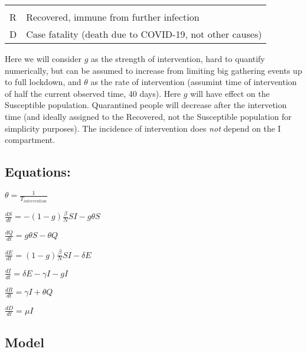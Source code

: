 \documentclass[]{article}
\begin{document}
\begin{longtable}[]{@{}ll@{}}
\begin{minipage}[t]{0.83\columnwidth}
\end{minipage}\tabularnewline
\begin{minipage}[t]{0.11\columnwidth}\raggedright
R\strut
\end{minipage} & \begin{minipage}[t]{0.83\columnwidth}\raggedright
Recovered, immune from further infection\strut
\end{minipage}\tabularnewline
\begin{minipage}[t]{0.11\columnwidth}\raggedright
D\strut
\end{minipage} & \begin{minipage}[t]{0.83\columnwidth}\raggedright
Case fatality (death due to COVID-19, not other causes)\strut
\end{minipage}\tabularnewline
\bottomrule
\end{longtable}

Here we will consider \(g\) as the strength of intervention, hard to
quantify numerically, but can be assumed to increase from limiting big
gathering events up to full lockdown, and \(\theta\) as the rate of
intervention (assumint time of intervention of half the current observed
time, 40 days). Here \(g\) will have effect on the Susceptible
population. Quarantined people will decrease after the intervetion time
(and ideally assigned to the Recovered, not the Susceptible population
for simplicity purposes). The incidence of intervention does \emph{not}
depend on the I compartment.

\hypertarget{equations-1}{%
\subsection{Equations:}\label{equations-1}}

\(\displaystyle \theta = \frac{1}{T_{intervention}}\)

\(\displaystyle \frac{dS}{dt} = - (1-g)\frac{\beta}{N}SI - g\theta S\)

\(\displaystyle \frac{dQ}{dt} = g\theta S - \theta Q\)

\(\displaystyle \frac{dE}{dt} = (1-g)\frac{\beta}{N}SI - \delta E\)

\(\displaystyle \frac{dI}{dt} = \delta E - \gamma I - gI\)

\(\displaystyle \frac{dR}{dt} = \gamma I + \theta Q\)

\(\displaystyle \frac{dD}{dt} = \mu I\)

\hypertarget{model-1}{%
\subsection{Model}\label{model-1}}
\end{document}

